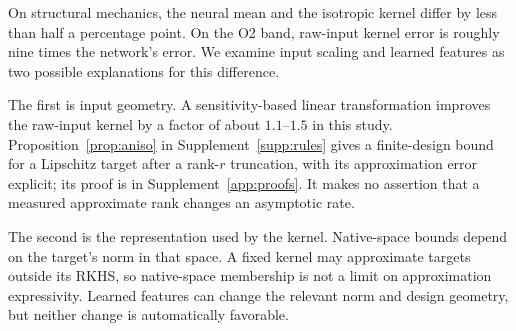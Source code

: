 On structural mechanics, the neural mean and the isotropic kernel differ by
less than half a percentage point. On the O2 band, raw-input kernel error is
roughly nine times the network's error. We examine input scaling and learned
features as two possible explanations for this difference.

The first is input geometry. A sensitivity-based linear transformation improves the raw-input kernel by a factor of about $1.1$--$1.5$ in this study. Proposition~\ref{prop:aniso} in Supplement~\ref{supp:rules} gives a finite-design bound for a Lipschitz target after a rank-$r$ truncation, with its approximation error explicit; its proof is in Supplement~\ref{app:proofs}. It makes no assertion that a measured approximate rank changes an asymptotic rate.

The second is the representation used by the kernel. Native-space bounds depend on the target's norm in that space. A fixed kernel may approximate targets outside its RKHS, so native-space membership is not a limit on approximation expressivity. Learned features can change the relevant norm and design geometry, but neither change is automatically favorable.

